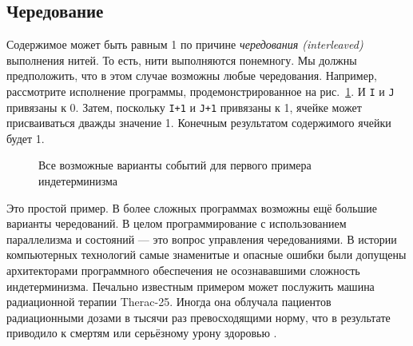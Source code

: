 \subsection{Чередование}

Содержимое может быть равным 1 по причине \emph{чередования (interleaved)} выполнения нитей. То есть, нити выполняются понемногу. Мы должны предположить, что в этом случае возможны любые чередования. Например, рассмотрите исполнение программы, продемонстрированное на рис.~\ref{figure:Execution_second_nondeterm_example}. И \lstinline|I| и \lstinline|J| привязаны к 0. Затем, поскольку \lstinline|I+1| и \lstinline|J+1| привязаны к 1, ячейке может присваиваться дважды значение 1. Конечным результатом содержимого ячейки будет 1.

\begin{figure}
\caption{Все возможные варианты событий для первого примера индетерминизма}
\label{figure:Execution_second_nondeterm_example}
\end{figure}

Это простой пример. В более сложных программах возможны ещё большие варианты чередований. В целом программирование с использованием параллелизма и состояний --- это вопрос управления чередованиями. В истории компьютерных технологий самые знаменитые и опасные ошибки были допущены архитекторами программного обеспечения не осознававшими сложность индетерминизма. Печально известным примером может послужить машина радиационной терапии Therac-25. Иногда она облучала пациентов радиационными дозами в тысячи раз превосходящими норму, что в результате приводило к смертям или серьёзному урону здоровью \cite{112}.

